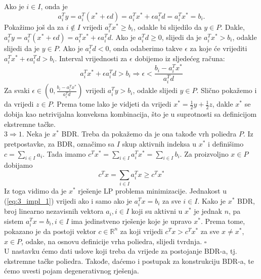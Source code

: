 \documentclass[a4paper, utf8, 11pt, colorlinks]{book}
\newenvironment{proof}{{Dokaz:}}{\hfill$\square$}
\begin{document}
\begin{proof}
       Ako je $i \in I$, onda je $$a_i^T y = a_i^T (x^* + \epsilon d) = a_i^T x^* + \epsilon a_i^T d = a_i^T x^* = b_i. $$
       Pokažimo još da za $i \not \in I$ vrijedi $a_i^T x^* \geq b_i$, odakle bi slijedilo da $y \in P$. Dakle, $a_i^T y = a_i^T (x^* + \epsilon d) = a_i^T x^* + \epsilon a_i^T d $. Ako je $a_i^T d \geq 0$, slijedi da je 
       $a_i^T x^* > b_i$, odakle slijedi da je $y \in  P$. Ako je $a_i^T d < 0$, onda odaberimo takve $\epsilon$ za koje će vrijediti $a_i^T x^* + \epsilon a_i^T d > b_i$. Interval   vrijednosti za $\epsilon$ dobijemo iz sljedećeg računa:
       $$ a_i^T x^* + \epsilon a_i^T d > b_i \Rightarrow \epsilon < \frac{b_i - a_i^T x^*}{a_i^T d}  $$
       Za svaki $\epsilon \in (0,  \frac{b_i - a_i^T x^*}{a_i^T d} )$ vrijedi $a_i^T y > b_i$, odakle slijedi $y \in P$. Slično pokažemo i da vrijedi $z \in P$. 
       Prema tome lako je vidjeti da vrijedi $x^* = \frac{1}{2}y +\frac{1}{2} z$, dakle $x^*$ se dobija kao netrivijalna konveksna kombinacija, što je u suprotnosti sa definicijom ekstremne tačke. \\
       $3 \Rightarrow 1$. Neka je $x^*$ BDR. Treba da pokažemo da je ona takođe vrh poliedra $P$. Iz pretpostavke, za BDR, označimo sa $I$ skup aktivnih indeksa u $x^*$ i definišimo $c = \sum_{i \in I} a_i$.  Tada imamo 
       $ c^T x^* = \sum_{i \in I } a_i^T x^* = \sum_{i \in I} b_i$. Za proizvoljno $x \in P$ dobijamo
       \begin{equation}\label{eq:3_impl_1}
          c^T x = \sum_{i \in I} a_i^T x \geq c^T x^*  
       \end{equation}
     Iz toga vidimo da je $x^*$ rješenje LP problema minimizacije. Jednakost u (\ref{eq:3_impl_1}) vrijedi ako i samo ako je $a_i^T x = b_i$ za sve $i \in I$. Kako je $x^*$ BDR, broj linearno nezavisnih vektora $a_i, i \in I$ koji su  aktivni u $x^*$ je jednak $n$, pa sistem $a_i^T x = b_i, i \in I$ ima jedinstveno rješenje koje je upravo $x^*$. Prema tome, pokazano je da postoji vektor $c \in \mathbb{R}^n$ za koji vrijedi $c^T x > c^T x^*$ za sve $x \neq x^*$, $x \in P$, odake, na osnovu definicije vrha poliedra, slijedi tvrdnja. 
\end{proof}\\

U nastavku ćemo dati uslove koji treba da vrijede za postojanje BDR-a, tj. 
 ekstremne tačke poliedra. Takođe, daćemo i postupak za konstrukciju BDR-a, te ćemo uvesti pojam degenerativnog rješenja.
\end{document}
